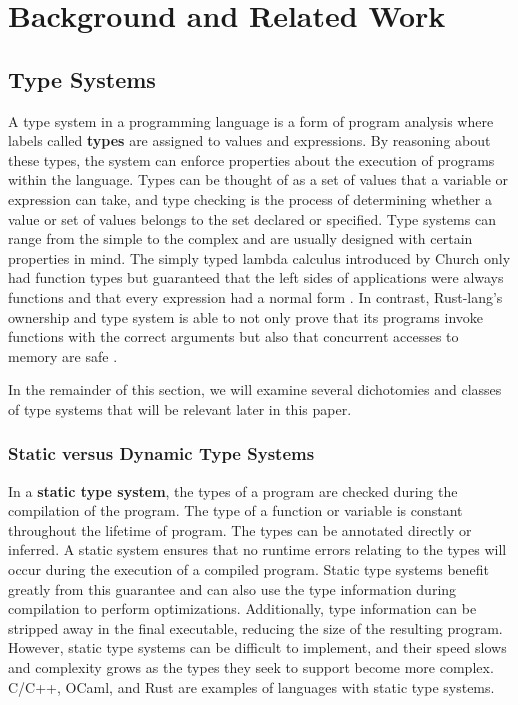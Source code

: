 \documentclass{report}
\begin{document}
\chapter{Background and Related Work}

\section{Type Systems}

A type system in a programming language is a form of program analysis where labels called \textbf{types} are assigned to values and expressions. By reasoning about these types, the system can enforce properties about the execution of programs within the language. Types can be thought of as a set of values that a variable or expression can take, and type checking is the process of determining whether a value or set of values belongs to the set declared or specified. Type systems can range from the simple to the complex and are usually designed with certain properties in mind. The simply typed lambda calculus introduced by Church only had function types but guaranteed that the left sides of applications were always functions and that every expression had a normal form \cite{Church1940AFO}. In contrast, Rust-lang's ownership and type system is able to not only prove that its programs invoke functions with the correct arguments but also that concurrent accesses to memory are safe \cite{rustlang}.

In the remainder of this section, we will examine several dichotomies and classes of type systems that will be relevant later in this paper.

\subsection{Static versus Dynamic Type Systems}

In a \textbf{static type system}, the types of a program are checked during the compilation of the program. The type of a function or variable is constant throughout the lifetime of program. The types can be annotated directly or inferred. A static system ensures that no runtime errors relating to the types will occur during the execution of a compiled program. Static type systems benefit greatly from this guarantee and can also use the type information during compilation to perform optimizations. Additionally, type information can be stripped away in the final executable, reducing the size of the resulting program. However, static type systems can be difficult to implement, and their speed slows and complexity grows as the types they seek to support become more complex. C/C++, OCaml, and Rust are examples of languages with static type systems.
\end{document}

